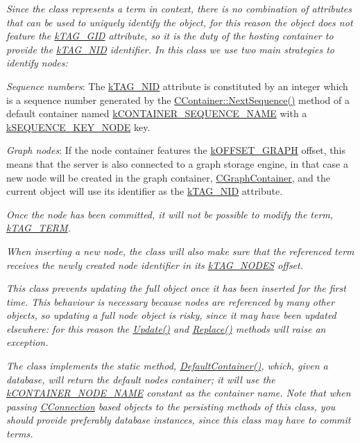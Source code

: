 {\itshape Since the class represents a term in context, there is no combination of attributes that can be used to uniquely identify the object, for this reason the object does not feature the \hyperlink{}{k\-T\-A\-G\-\_\-\-G\-I\-D} attribute, so it is the duty of the hosting container to provide the \hyperlink{}{k\-T\-A\-G\-\_\-\-N\-I\-D} identifier. In this class we use two main strategies to identify nodes\-:}

{\itshape 
\begin{DoxyItemize}
\item {\itshape Sequence numbers}\-: The \hyperlink{}{k\-T\-A\-G\-\_\-\-N\-I\-D} attribute is constituted by an integer which is a sequence number generated by the \hyperlink{class_c_container_afa72f0da28ad8c3955cb9fedbc0ac2df}{C\-Container\-::\-Next\-Sequence()} method of a default container named \hyperlink{}{k\-C\-O\-N\-T\-A\-I\-N\-E\-R\-\_\-\-S\-E\-Q\-U\-E\-N\-C\-E\-\_\-\-N\-A\-M\-E} with a \hyperlink{}{k\-S\-E\-Q\-U\-E\-N\-C\-E\-\_\-\-K\-E\-Y\-\_\-\-N\-O\-D\-E} key. 
\item {\itshape Graph nodes}\-: If the node container features the \hyperlink{}{k\-O\-F\-F\-S\-E\-T\-\_\-\-G\-R\-A\-P\-H} offset, this means that the server is also connected to a graph storage engine, in that case a new node will be created in the graph container, \hyperlink{class_c_graph_container}{C\-Graph\-Container}, and the current object will use its identifier as the \hyperlink{}{k\-T\-A\-G\-\_\-\-N\-I\-D} attribute. 
\end{DoxyItemize}}

{\itshape Once the node has been committed, it will not be possible to modify the term, \hyperlink{}{k\-T\-A\-G\-\_\-\-T\-E\-R\-M}.}

{\itshape When inserting a new node, the class will also make sure that the referenced term receives the newly created node identifier in its \hyperlink{}{k\-T\-A\-G\-\_\-\-N\-O\-D\-E\-S} offset.}

{\itshape This class prevents updating the full object once it has been inserted for the first time. This behaviour is necessary because nodes are referenced by many other objects, so updating a full node object is risky, since it may have been updated elsewhere\-: for this reason the \hyperlink{}{Update()} and \hyperlink{}{Replace()} methods will raise an exception.}

{\itshape The class implements the static method, \hyperlink{}{Default\-Container()}, which, given a database, will return the default nodes container; it will use the \hyperlink{}{k\-C\-O\-N\-T\-A\-I\-N\-E\-R\-\_\-\-N\-O\-D\-E\-\_\-\-N\-A\-M\-E} constant as the container name. Note that when passing \hyperlink{class_c_connection}{C\-Connection} based objects to the persisting methods of this class, you should provide preferably database instances, since this class may have to commit terms.}

